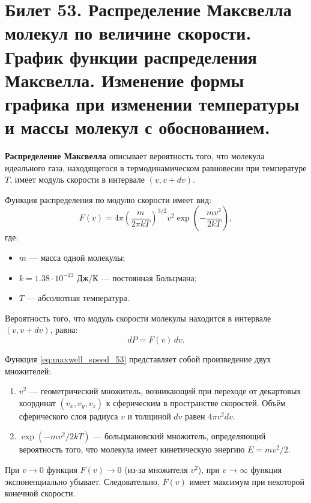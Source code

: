 \section{Билет 53. Распределение Максвелла молекул по величине скорости. График функции распределения Максвелла. Изменение формы графика при изменении температуры и массы молекул с обоснованием.}

\begin{definition}
\textbf{Распределение Максвелла} описывает вероятность того, что молекула идеального газа, находящегося в термодинамическом равновесии при температуре $T$, имеет модуль скорости в интервале $(v, v + dv)$.
\par\noindent Функция распределения по модулю скорости имеет вид:
\begin{equation}
    F(v) = 4\pi \left( \frac{m}{2\pi k T} \right)^{3/2} v^2 \exp\left( -\frac{m v^2}{2 k T} \right), \label{eq:maxwell_speed_53}
\end{equation}
где:
\begin{itemize}
    \item $m$ --- масса одной молекулы;
    \item $k = 1.38 \cdot 10^{-23}$ Дж/К --- постоянная Больцмана;
    \item $T$ --- абсолютная температура.
\end{itemize}
Вероятность того, что модуль скорости молекулы находится в интервале $(v, v + dv)$, равна:
\begin{equation}
    dP = F(v) \, dv.
\end{equation}
\end{definition}

\begin{property}
Функция \eqref{eq:maxwell_speed_53} представляет собой произведение двух множителей:
\begin{enumerate}
    \item $v^2$ --- геометрический множитель, возникающий при переходе от декартовых координат $(v_x, v_y, v_z)$ к сферическим в пространстве скоростей. Объём сферического слоя радиуса $v$ и толщиной $dv$ равен $4\pi v^2 dv$.
    \item $\exp(-mv^2/2kT)$ --- больцмановский множитель, определяющий вероятность того, что молекула имеет кинетическую энергию $E = mv^2/2$.
\end{enumerate}
При $v \to 0$ функция $F(v) \to 0$ (из-за множителя $v^2$), при $v \to \infty$ функция экспоненциально убывает. Следовательно, $F(v)$ имеет максимум при некоторой конечной скорости.
\end{property}

